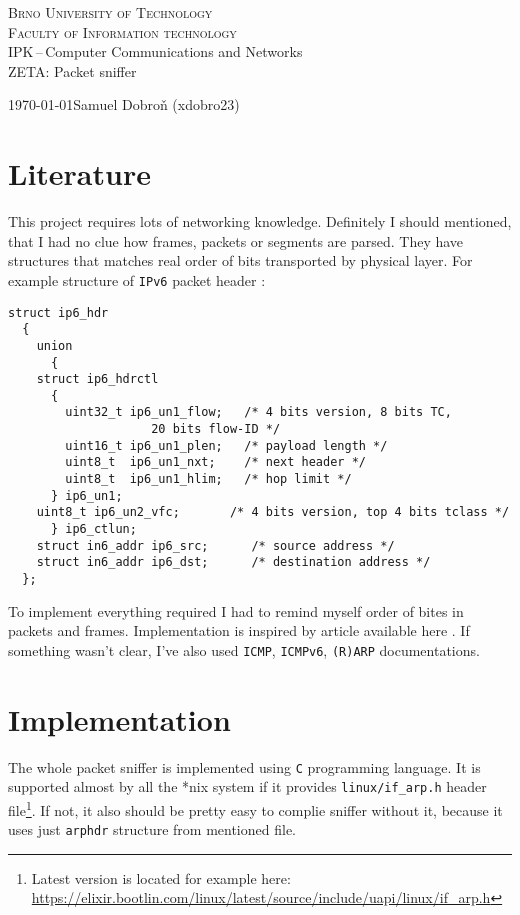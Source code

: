 \documentclass[11pt, a4paper]{article}
\begin{document}
	\begin{titlepage}
		\begin{center}
				\Huge{\textsc{Brno University of Technology}}\\
				\huge{\textsc{Faculty of Information technology}}
			\\
			\LARGE{IPK\,--\,Computer Communications and Networks}\\
			\Huge{ZETA: Packet sniffer}
		\end{center}
    	{\Large \today \hfill Samuel Dobroň (xdobro23)}
	\end{titlepage}

    \tableofcontents
    \newpage
    
    \section{Literature}
        This project requires lots of networking knowledge. Definitely I should mentioned, that I had no clue how frames, packets or segments are parsed.
        They have structures that matches real order of bits transported by physical layer. For example structure of \texttt{IPv6} packet header \cite{ipv6hdr}:
        \begin{verbatim}
struct ip6_hdr
  {
    union
      {
	struct ip6_hdrctl
	  {
	    uint32_t ip6_un1_flow;   /* 4 bits version, 8 bits TC,
					20 bits flow-ID */
	    uint16_t ip6_un1_plen;   /* payload length */
	    uint8_t  ip6_un1_nxt;    /* next header */
	    uint8_t  ip6_un1_hlim;   /* hop limit */
	  } ip6_un1;
	uint8_t ip6_un2_vfc;       /* 4 bits version, top 4 bits tclass */
      } ip6_ctlun;
    struct in6_addr ip6_src;      /* source address */
    struct in6_addr ip6_dst;      /* destination address */
  };
        \end{verbatim}
        To implement everything required I had to remind myself order of bites in packets and frames.
        Implementation is inspired by article available here \cite{usingpcap}. If something wasn't clear, I've also used \texttt{ICMP}\cite{icmp}, \texttt{ICMPv6}\cite{icmpv6}, \texttt{(R)ARP}\cite{arp} documentations.
    	
    \section{Implementation}
        The whole packet sniffer is implemented using \texttt{C} programming language. It is supported almost by all the *nix system if it provides \texttt{linux/if\_arp.h} header file\footnote{Latest version is located for example here: \url{https://elixir.bootlin.com/linux/latest/source/include/uapi/linux/if_arp.h}}. If not, it also should be pretty easy to complie sniffer without it, because it uses just \texttt{arphdr} structure from mentioned file.
        
\end{document}
